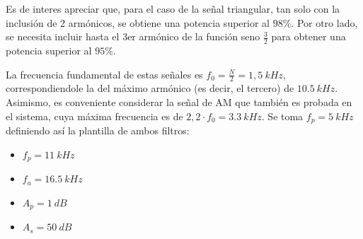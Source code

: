 Es de interes apreciar que, para el caso de la señal triangular, tan solo con la inclusión de 2 armónicos, se obtiene una potencia superior al $98\%$. Por otro lado, se necesita incluir hasta el 3er armónico de la función  seno $\frac{3}{2}$ para obtener una potencia superior al $95\%$.

La frecuencia fundamental de estas señales es $f_0 = \frac{N}{2} = 1,5 \ kHz$, correspondiendole la del máximo armónico (es decir, el tercero) de $10.5 \ kHz$. Asimismo, es conveniente considerar la señal de AM que también es probada en el sistema, cuya máxima frecuencia es de $2,2 \cdot f_0 = 3.3 \ kHz$. Se toma $f_p= 5 \ kHz$  definiendo así la plantilla de ambos filtros:
\begin{multicols}{2}
\begin{itemize}
	\item $f_p = 11\ kHz$
	\item $f_a = 16.5 \ kHz$
	\item $A_p = 1 \ dB$
	\item $A_s = 50 \ dB$
\end{itemize}
\end{multicols}

